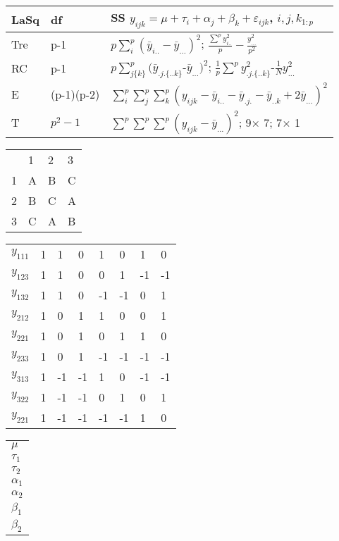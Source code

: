 \documentclass[
  10pt,
  twocolumn]{article}
\begin{document}
\begin{tabular}{l|l|l}\hline
LaSq& df       & SS $y_{ijk}=\mu+\tau_i+\alpha_j+\beta_k+\varepsilon_{ijk}$, $i,j,k_{1:p}$  \\\hline
Tre &p-1       &$p\sum^p_{i}(\bar y_{i..}-\bar y_{...})^2$; $\frac{\sum^py_{i..}^2}{p}-\frac{y_{...}^2}{p^2}$\\
RC  &p-1       &$p\sum^p_{j\{k\}}(\bar y_{.j.\{..k\}}$-$\bar y_{...})^2$; $\frac1p\sum^p y_{.j.\{..k\}}^2$-$\frac1Ny_{...}^2$\\
E   &(p-1)(p-2)&$\sum^p_{i}\sum^p_{j}\sum^p_{k}( y_{ijk}-\bar y_{i..}-\bar y_{.j.}-\bar y_{..k}+2\bar y_{...})^2$\\ 
T   &$p^2-1$   &$\sum^p\sum^p\sum^p(y_{ijk}-\bar y_{...})^2$; 9$\times$ 7; 7$\times$ 1\\\hline
\end{tabular}
\begin{tabular}{l|l|l|l}
&1&2&3\\
1&A&B&C\\
2&B&C&A\\
3&C&A&B\\
\end{tabular}
\begin{tabular}{l|l|ll|ll|ll}
$y_{111}$&1& 1 & 0 & 1 & 0 & 1 & 0 \\
$y_{123}$&1& 1 & 0 & 0 & 1 &-1 &-1 \\
$y_{132}$&1& 1 & 0 &-1 &-1 & 0 & 1 \\\hline
$y_{212}$&1& 0 & 1 & 1 & 0 & 0 & 1 \\
$y_{221}$&1& 0 & 1 & 0 & 1 & 1 & 0 \\
$y_{233}$&1& 0 & 1 &-1 &-1 &-1 &-1 \\\hline
$y_{313}$&1&-1 &-1 & 1 & 0 &-1 &-1 \\
$y_{322}$&1&-1 &-1 & 0 & 1 & 0 & 1 \\
$y_{221}$&1&-1 &-1 &-1 &-1 & 1 & 0 \\\hline
\end{tabular}
\begin{tabular}{|l|}
$\mu$\\
$\tau_{1}$\\
$\tau_{2}$\\
$\alpha_{1}$\\
$\alpha_{2}$\\
$\beta_{1}$\\
$\beta_{2}$\\
\end{tabular}
\end{document}
